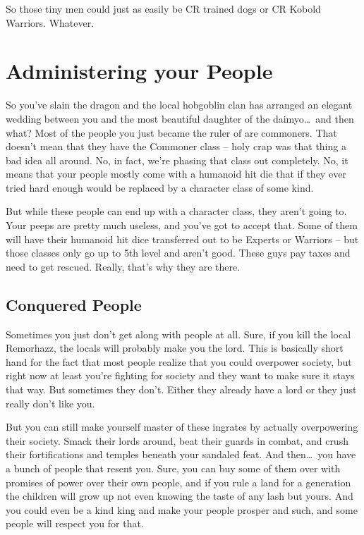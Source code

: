 So those tiny men could just as easily be CR \half trained dogs or CR \half Kobold Warriors. Whatever.

\section{Administering your People}
\vspace*{-8pt}

So you've slain the dragon and the local hobgoblin clan has arranged an elegant wedding between you and the most beautiful daughter of the daimyo\ldots\  and then what? Most of the people you just became the ruler of are commoners. That doesn't mean that they have the Commoner class -- holy crap was that thing a bad idea all around. No, in fact, we're phasing that class out completely. No, it means that your people mostly come with a humanoid hit die that if they ever tried hard enough would be replaced by a character class of some kind.

But while these people can end up with a character class, they aren't going to. Your peeps are pretty much useless, and you've got to accept that. Some of them will have their humanoid hit dice transferred out to be Experts or Warriors -- but those classes only go up to 5th level and aren't good. These guys pay taxes and need to get rescued. Really, that's why they are there.

\subsection{Conquered People}
\vspace*{-8pt}

Sometimes you just don't get along with people at all. Sure, if you kill the local Remorhazz, the locals will probably make you the lord. This is basically short hand for the fact that most people realize that you could overpower society, but right now at least you're fighting for society and they want to make sure it stays that way. But sometimes they don't. Either they already have a lord or they just really don't like you.

But you can still make yourself master of these ingrates by actually overpowering their society. Smack their lords around, beat their guards in combat, and crush their fortifications and temples beneath your sandaled feat. And then\ldots\  you have a bunch of people that resent you. Sure, you can buy some of them over with promises of power over their own people, and if you rule a land for a generation the children will grow up not even knowing the taste of any lash but yours. And you could even be a kind king and make your people prosper and such, and some people will respect you for that.


